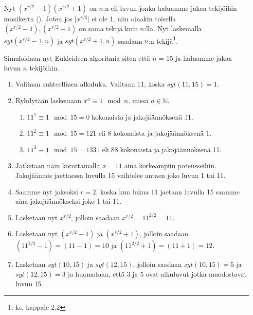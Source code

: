 Nyt $(x^{r/2} - 1)(x^{r/2} + 1)$ on $n$:n eli luvun jonka haluamme jakaa tekijöihin monikerta (\cite{hayward2008quantum}). Joten jos $\lvert x^{r/2} \rvert$ ei ole 1, niin ainakin toisella $(x^{r/2} - 1), (x^{r/2} + 1)$ on sama tekijä kuin $n$:llä. Nyt laskemalla $syt(x^{r/2} - 1, n)$ ja $syt(x^{r/2} + 1, n)$ saadaan $n$:n tekijä\footnote{ks. kappale 2.2}.

Simuloidaan nyt Eukleideen algoritmia siten että $n$ = 15 ja haluamme jakaa luvun $n$ tekijöihin.
\begin{enumerate}
    \item Valitaan suhteellinen alkuluku. Valitaan 11, koska $syt(11,15) = 1$.
    
    \item Ryhdytään laskemaan $x^{a} \equiv 1 \mod n$, missä $a \in \mathbb{N}$.
    
    \begin{enumerate}
    
        \item $11^{1} \equiv 1 \mod 15 = 0$ kokonaista ja jakojäännöksenä 11.
        
        \item $11^{2} \equiv 1 \mod 15 = 121$ eli 8 kokonaista ja jakojäännöksenä 1.
        
        \item $11^{3} \equiv 1 \mod 15 = 1331$ eli 88 kokonaista ja jakojäännöksenä 11.
    \end{enumerate}
    
    \item Jatketaan näin korottamalla $x = 11$ aina korkeampiin potensseihin. Jakojäännös jaettaessa luvulla 15 vaihtelee antaen joko luvun 1 tai 11.
    
    \item Saamme nyt jaksoksi $r = 2$, koska kun lukua 11 jaetaan luvulla 15 saamme aina jakojäännökseksi joko 1 tai 11.
    
    \item Lasketaan nyt $x^{r/2}$, jolloin saadaan $x^{r/2} = 11^{2/2} = 11$.
    
    \item Lasketaan nyt $(x^{r/2}-1)$ ja $(x^{r/2}+1)$, jolloin saadaan $(11^{2/2} - 1) = (11 - 1) = 10$ ja $(11^{2/2} + 1) = (11 + 1) = 12$.
    
    \item Lasketaan $syt(10,15)$ ja $syt(12,15)$, jolloin saadaan $syt(10,15) = 5$ ja $syt(12,15) = 3$ ja huomataan, että 3 ja 5 ovat alkuluvut jotka muodostavat luvun 15.
    
\end{enumerate}

